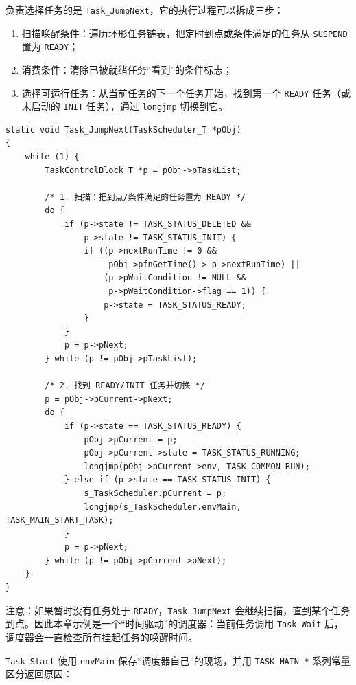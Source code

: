 负责选择任务的是 \texttt{Task\_JumpNext}，它的执行过程可以拆成三步：

\begin{enumerate}
\item 扫描唤醒条件：遍历环形任务链表，把定时到点或条件满足的任务从 \texttt{SUSPEND} 置为 \texttt{READY}；
\item 消费条件：清除已被就绪任务“看到”的条件标志；
\item 选择可运行任务：从当前任务的下一个任务开始，找到第一个 \texttt{READY} 任务（或未启动的 \texttt{INIT} 任务），通过 \texttt{longjmp} 切换到它。
\end{enumerate}

\begin{lstlisting}[style=c]
static void Task_JumpNext(TaskScheduler_T *pObj)
{
    while (1) {
        TaskControlBlock_T *p = pObj->pTaskList;

        /* 1. 扫描：把到点/条件满足的任务置为 READY */
        do {
            if (p->state != TASK_STATUS_DELETED &&
                p->state != TASK_STATUS_INIT) {
                if ((p->nextRunTime != 0 &&
                     pObj->pfnGetTime() > p->nextRunTime) ||
                    (p->pWaitCondition != NULL &&
                     p->pWaitCondition->flag == 1)) {
                    p->state = TASK_STATUS_READY;
                }
            }
            p = p->pNext;
        } while (p != pObj->pTaskList);

        /* 2. 找到 READY/INIT 任务并切换 */
        p = pObj->pCurrent->pNext;
        do {
            if (p->state == TASK_STATUS_READY) {
                pObj->pCurrent = p;
                pObj->pCurrent->state = TASK_STATUS_RUNNING;
                longjmp(pObj->pCurrent->env, TASK_COMMON_RUN);
            } else if (p->state == TASK_STATUS_INIT) {
                s_TaskScheduler.pCurrent = p;
                longjmp(s_TaskScheduler.envMain, TASK_MAIN_START_TASK);
            }
            p = p->pNext;
        } while (p != pObj->pCurrent->pNext);
    }
}
\end{lstlisting}

注意：如果暂时没有任务处于 \texttt{READY}，\texttt{Task\_JumpNext} 会继续扫描，直到某个任务到点。因此本章示例是一个“时间驱动”的调度器：当前任务调用 \texttt{Task\_Wait} 后，调度器会一直检查所有挂起任务的唤醒时间。

\texttt{Task\_Start} 使用 \texttt{envMain} 保存“调度器自己”的现场，并用 \texttt{TASK\_MAIN\_*} 系列常量区分返回原因：

